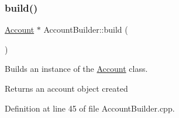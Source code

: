 \subsubsection{\texorpdfstring{build()}{build()}}
{\footnotesize\ttfamily \hyperlink{class_account}{Account} $\ast$ Account\+Builder\+::build (\begin{DoxyParamCaption}{ }\end{DoxyParamCaption})}

Builds an instance of the \hyperlink{class_account}{Account} class.

\begin{DoxyReturn}{Returns}
an account object created 
\end{DoxyReturn}


Definition at line 45 of file Account\+Builder.\+cpp.


